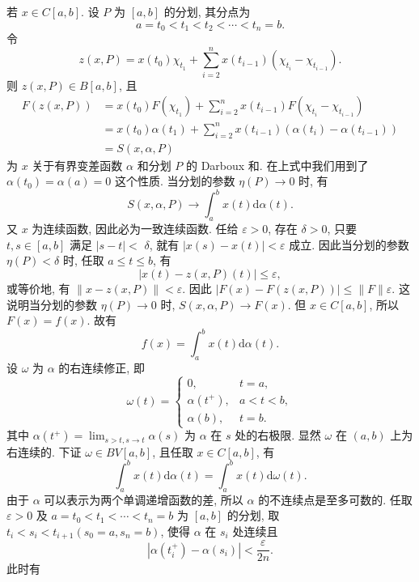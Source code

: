 \documentclass[openany]{ctexbook}
\makeatletter
\theoremstyle{kaiti}
\theoremstyle{normal}
\renewenvironment{proof}[1][\proofname]{\par
    \pushQED{\qed}%
    \normalfont \topsep6\p@\@plus6\p@\relax
    \trivlist
    \item\relax
    {\heiti #1}\hspace{2\labelsep}\ignorespaces
  }{%
    \popQED\endtrivlist\@endpefalse
  }
\makeatother
\begin{document}
\begin{proof}
若 $x \in C[a, b]$. 设 $P$ 为 $[a, b]$ 的分划, 其分点为
$$
a=t_0<t_1<t_2<\cdots<t_n=b.
$$
令
$$
z(x, P)=x\left(t_0\right) \chi_{t_1}+\sum_{i=2}^n x\left(t_{i-1}\right)\left(\chi_{t_{i}}-\chi_{t_{i-1}}\right).
$$
则 $z(x, P) \in B[a, b]$, 且
$$
\begin{aligned}
F(z(x, P)) &=x\left(t_0\right) F\left(\chi_{t_1}\right)+\sum_{i=2}^n x\left(t_{i-1}\right) F\left(\chi_{t_{i}}-\chi_{t_{i-1}}\right) \\
&=x\left(t_0\right) \alpha\left(t_1\right)+\sum_{i=2}^n x\left(t_{i-1}\right)\left(\alpha\left(t_{i}\right)-\alpha\left(t_{i-1}\right)\right) \\
&=S(x, \alpha, P)
\end{aligned}
$$
为 $x$ 关于有界变差函数 $\alpha$ 和分划 $P$ 的 Darboux 和. 在上式中我们用到了 $\alpha\left(t_0\right)=\alpha(a)=0$ 这个性质. 当分划的参数 $\eta(P) \rightarrow 0$ 时, 有
$$
S(x, \alpha, P) \rightarrow \int_{a}^{b} x(t) \mathrm{d} \alpha(t).
$$
又 $x$ 为连续函数, 因此必为一致连续函数. 任给 $\varepsilon>0$, 存在 $\delta>0$, 只要 $t, s \in[a, b]$ 满足 $|s-t|<$ $\delta$, 就有 $|x(s)-x(t)|<\varepsilon$ 成立. 因此当分划的参数 $\eta(P)<\delta$ 时, 任取 $a \leqslant t \leqslant b$, 有
$$
|x(t)-z(x, P)(t)| \leqslant \varepsilon,
$$
或等价地, 有 $\|x-z(x, P)\|<\varepsilon$. 因此 $|F(x)-F(z(x, P))| \leqslant\|F\| \varepsilon$. 这说明当分划的参数 $\eta(P) \rightarrow 0$ 时, $S(x, \alpha, P) \rightarrow F(x)$. 但 $x \in C[a, b]$, 所以 $F(x)=f(x)$. 故有
\begin{equation}
  f(x)=\int_{a}^{b} x(t) \mathrm{d} \alpha(t).
\end{equation}
设 $\omega$ 为 $\alpha$ 的右连续修正, 即
$$
\omega(t)= \begin{cases}0, & t=a, \\ \alpha\left(t^{+}\right), & a<t<b, \\ \alpha(b), & t=b.\end{cases}
$$
其中 $\alpha\left(t^{+}\right)=\lim_{s>t, s \rightarrow t} \alpha(s)$ 为 $\alpha$ 在 $s$ 处的右极限. 显然 $\omega$ 在 $(a, b)$ 上为右连续的. 下证 $\omega \in B V[a, b]$, 且任取 $x \in C[a, b]$, 有
$$
\int_{a}^{b} x(t) \mathrm{d} \alpha(t)=\int_{a}^{b} x(t) \mathrm{d} \omega(t).
$$
由于 $\alpha$ 可以表示为两个单调递增函数的差, 所以 $\alpha$ 的不连续点是至多可数的. 任取 $\varepsilon>0$ 及 $a=t_0<t_1<\cdots<t_n=b$ 为 $[a, b]$ 的分划, 取 $t_{i}<s_{i}<t_{i+1}\left(s_0=a, s_n=b\right)$, 使得 $\alpha$ 在 $s_{i}$ 处连续且
$$
\left|\alpha\left(t_{i}^{+}\right)-\alpha\left(s_{i}\right)\right|<\frac{\varepsilon}{2 n}.
$$
此时有
$$
\begin{aligned}

\end{aligned}$$
\end{proof}
\end{document}
